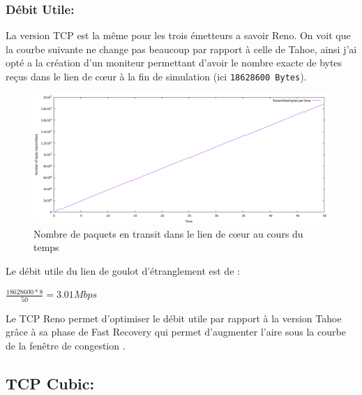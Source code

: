 \documentclass[a4paper,12pt]{article}
\begin{document}
\subsubsection{Débit Utile:}
La version TCP est la même pour les trois émetteurs a savoir Reno. On voit que la courbe suivante ne change pas beaucoup par rapport à celle de Tahoe, ainsi j'ai opté a la création d'un moniteur permettant d'avoir le nombre exacte de bytes reçus dans le lien de cœur à la fin de simulation (ici \texttt{18628600 Bytes}).  
\begin{figure}[H]
\centering
\includegraphics[width=16cm]{img/paquets_received_reno.png}
\caption{Nombre de paquets en transit dans le lien de cœur au cours du temps}
\end{figure}
Le débit utile du lien de goulot d'étranglement est de : 
\begin{center}
	$\frac{18628600*8}{50} = 3.01 Mbps$ 
\end{center}
Le TCP Reno permet d'optimiser le débit utile par rapport à la version Tahoe grâce à sa phase de Fast Recovery qui permet d'augmenter l'aire sous la courbe de la fenêtre de congestion .

\subsection{TCP Cubic:}
\end{document}
